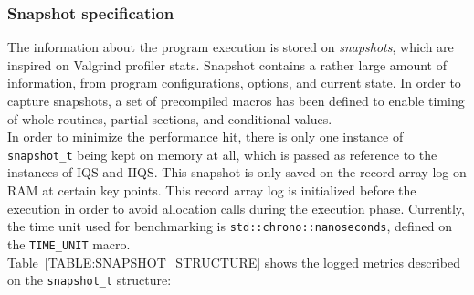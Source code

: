 \subsubsection{Snapshot specification}
The information about the program execution is stored on \textit{snapshots}, which are inspired on Valgrind profiler stats. Snapshot contains a rather large amount of information, from program configurations, options, and current state. In order to capture snapshots, a set of precompiled macros has been defined to enable timing of whole routines, partial sections, and conditional values. \\

In order to minimize the performance hit, there is only one instance of \texttt{snapshot\_t} being kept on memory at all, which is passed as reference to the instances of IQS and IIQS. This snapshot is only saved on the record array log on RAM at certain key points. This record array log is initialized before the execution in order to avoid allocation calls during the execution phase. Currently, the time unit used for benchmarking is \texttt{std::chrono::nanoseconds}, defined on the \texttt{TIME\_UNIT} macro.\\

Table~\ref{TABLE:SNAPSHOT_STRUCTURE} shows the logged metrics described on the \texttt{snapshot\_t} structure:\\

